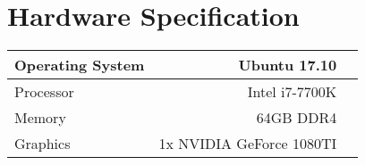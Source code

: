 \documentclass{uia}
\begin{document}
\section{Hardware Specification}
\label{appendix:hwspec}
	\begin{table}[H]
	\begin{tabular}{|l*{1}{r}|r}
		\hline
		Operating System & Ubuntu 17.10  \\
		\hline
		Processor            & Intel i7-7700K \\
		\hline
		Memory           & 64GB DDR4  \\
		\hline
		Graphics     & 1x NVIDIA GeForce 1080TI   \\
		\hline
	\end{tabular}
\end{table}

\makebackcover
\end{document}
